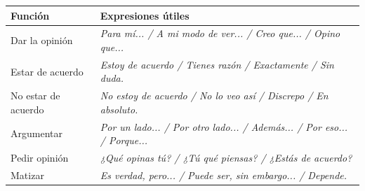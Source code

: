 \documentclass[11pt]{article}
\newcommand{\esp}[1]{\ifmmode\text{\textit{#1}}\else\begingroup\selectlanguage{spanish}\itshape #1\endgroup\fi}
\begin{document}
\begin{aretenir}
\begin{center}
\begin{tabularx}{\linewidth}{|X|X|}
\hline
\rowcolor{popblueL} Función & Expresiones útiles \\
\hline
Dar la opinión & \esp{Para mí... / A mi modo de ver... / Creo que... / Opino que...} \\
\hline
Estar de acuerdo & \esp{Estoy de acuerdo / Tienes razón / Exactamente / Sin duda.} \\
\hline
No estar de acuerdo & \esp{No estoy de acuerdo / No lo veo así / Discrepo / En absoluto.} \\
\hline
Argumentar & \esp{Por un lado... / Por otro lado... / Además... / Por eso... / Porque...} \\
\hline
Pedir opinión & \esp{¿Qué opinas tú? / ¿Tú qué piensas? / ¿Estás de acuerdo?} \\
\hline
Matizar & \esp{Es verdad, pero... / Puede ser, sin embargo... / Depende.} \\
\hline
\end{tabularx}
\end{center}
\end{aretenir}
\end{document}

